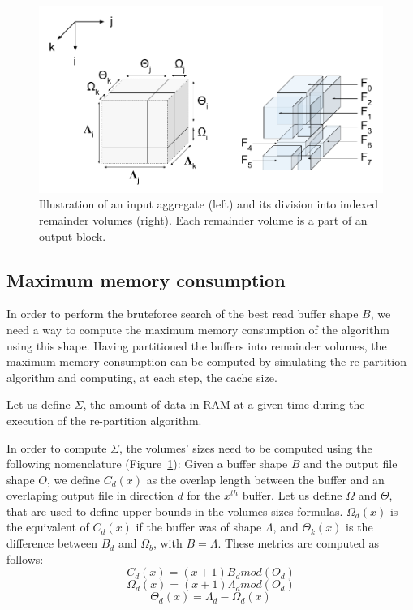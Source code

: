 \documentclass[sigconf, nonacm]{acmart}
\begin{document}
\begin{figure}[h]
\centering
\includegraphics[scale=0.4]{./figures/new/figure_3.png}
\caption{Illustration of an input aggregate (left) and its division into indexed remainder volumes (right).
Each remainder volume is a part of an output block.}
\label{fig:nomenclature_overlaps}
\end{figure}

\subsection{Maximum memory consumption}
In order to perform the bruteforce search of the best read buffer shape $B$,
we need a way to compute the maximum memory consumption of the algorithm using
this shape.
Having partitioned the buffers into remainder volumes, the maximum memory
consumption can be computed by simulating the re-partition algorithm and
computing, at each step, the cache size.

Let us define $\Sigma$, the amount of data in RAM at a given time during the
execution of the re-partition algorithm.

In order to compute $\Sigma$, the volumes' sizes need to be computed using the
following nomenclature (Figure~\ref{fig:nomenclature_overlaps}):
Given a buffer shape $B$ and the output file shape $O$, we define $C_d(x)$ as
the overlap length between the buffer and an overlaping output file in direction
$d$ for the $x^{th}$ buffer. Let us define $\Omega$ and $\Theta$, that are used
to define upper bounds in the volumes sizes formulas. $\Omega_d(x)$ is the
equivalent of $C_d(x)$ if the buffer was of shape $\Lambda$, and $\Theta_k(x)$
is the difference between $B_d$ and $\Omega_b$, with $B=\Lambda$.
These metrics are computed as follows:
$$C_d(x) = (x+1)B_d mod(O_d)$$
$$\Omega_d(x) = (x+1)\Lambda_d mod(O_d)$$
$$\Theta_d(x) = \Lambda_d - \Omega_d(x)$$
\end{document}
